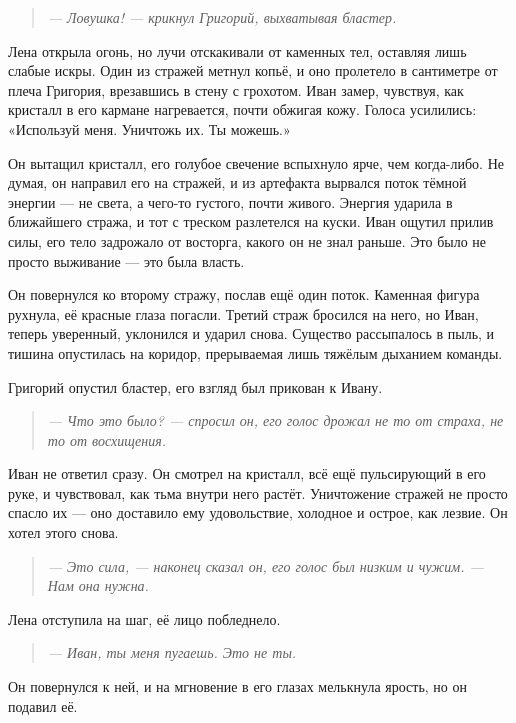 \documentclass[12pt,a4paper]{book} %
\newenvironment{dialogue}{\begin{quote}\itshape}{\end{quote}}
\begin{document}
\begin{dialogue}
--- Ловушка! --- крикнул Григорий, выхватывая бластер.
\end{dialogue}

Лена открыла огонь, но лучи отскакивали от каменных тел, оставляя лишь слабые искры. Один из стражей метнул копьё, и оно пролетело в сантиметре от плеча Григория, врезавшись в стену с грохотом. Иван замер, чувствуя, как кристалл в его кармане нагревается, почти обжигая кожу. Голоса усилились: «Используй меня. Уничтожь их. Ты можешь.»

Он вытащил кристалл, его голубое свечение вспыхнуло ярче, чем когда-либо. Не думая, он направил его на стражей, и из артефакта вырвался поток тёмной энергии --- не света, а чего-то густого, почти живого. Энергия ударила в ближайшего стража, и тот с треском разлетелся на куски. Иван ощутил прилив силы, его тело задрожало от восторга, какого он не знал раньше. Это было не просто выживание --- это была власть.

Он повернулся ко второму стражу, послав ещё один поток. Каменная фигура рухнула, её красные глаза погасли. Третий страж бросился на него, но Иван, теперь уверенный, уклонился и ударил снова. Существо рассыпалось в пыль, и тишина опустилась на коридор, прерываемая лишь тяжёлым дыханием команды.

Григорий опустил бластер, его взгляд был прикован к Ивану.

\begin{dialogue}
--- Что это было? --- спросил он, его голос дрожал не то от страха, не то от восхищения.
\end{dialogue}

Иван не ответил сразу. Он смотрел на кристалл, всё ещё пульсирующий в его руке, и чувствовал, как тьма внутри него растёт. Уничтожение стражей не просто спасло их --- оно доставило ему удовольствие, холодное и острое, как лезвие. Он хотел этого снова.

\begin{dialogue}
--- Это сила, --- наконец сказал он, его голос был низким и чужим. --- Нам она нужна.
\end{dialogue}

Лена отступила на шаг, её лицо побледнело.

\begin{dialogue}
--- Иван, ты меня пугаешь. Это не ты.
\end{dialogue}

Он повернулся к ней, и на мгновение в его глазах мелькнула ярость, но он подавил её.
\end{document}
